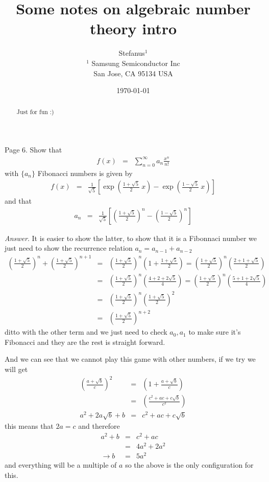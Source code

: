 \documentclass[aps,preprint,preprintnumbers,nofootinbib,showpacs,prd]{revtex4-1}
\newcommand{\nbea}{\begin{eqnarray*}}
\newcommand{\neea}{\end{eqnarray*}}
\begin{document}
\title{Some notes on algebraic number theory intro}
\bigskip
\author{Stefanus$^1$\\
$^1$ Samsung Semiconductor Inc\\ San Jose, CA 95134 USA\\
}
%
\date{\today}
%
\begin{abstract}
Just for fun :)

\end{abstract}
%
\maketitle

\renewcommand{\theequation}{A.\arabic{equation}}  %
\setcounter{equation}{0}  %


Page 6. Show that 
%
\nbea
f(x) & = & \sum_{n = 0}^{\infty} a_n \frac{x^n}{n!} 
\neea
%
with $\{a_n\}$ Fibonacci numbers is given by
%
\nbea
f(x) & = & \frac{1}{\sqrt{5}} \left \lbrack \exp \left ( \frac{1 + \sqrt{5}}{2}~x\right ) - \exp \left ( \frac{1 - \sqrt{5}}{2}~x\right ) \right \rbrack
\neea
%
and that 
%
\nbea
a_n & = & \frac{1}{\sqrt{5}} \left \lbrack \left ( \frac{1 + \sqrt{5}}{2}\right )^n - \left ( \frac{1 - \sqrt{5}}{2}\right )^n \right \rbrack
\neea
%

{\it Answer}. It is easier to show the latter, to show that it is a Fibonnaci number we just need to show the recurrence relation $a_n = a_{n-1} + a_{n - 2}$
%
\nbea
\left ( \frac{1 + \sqrt{5}}{2}\right )^{n} + \left ( \frac{1 + \sqrt{5}}{2}\right )^{n + 1} & = & \left ( \frac{1 + \sqrt{5}}{2}\right )^{n}\left ( 1 + \frac{1 + \sqrt{5}}{2}\right ) = \left ( \frac{1 + \sqrt{5}}{2}\right )^{n}\left ( \frac{2 + 1 + \sqrt{5}}{2}\right ) \\
& = & \left ( \frac{1 + \sqrt{5}}{2}\right )^{n}\left ( \frac{4 + 2 + 2\sqrt{5}}{4}\right ) = \left ( \frac{1 + \sqrt{5}}{2}\right )^{n}\left ( \frac{5 + 1 + 2\sqrt{5}}{4}\right ) \\
& = & \left ( \frac{1 + \sqrt{5}}{2}\right )^{n}\left ( \frac{1 + \sqrt{5}}{2}\right )^2 \\
& = & \left ( \frac{1 + \sqrt{5}}{2}\right )^{n + 2}
\neea
%
ditto with the other term and we just need to check $a_0, a_1$ to make sure it's Fibonacci and they are the rest is straight forward.

And we can see that we cannot play this game with other numbers, if we try we will get
%
\nbea
\left ( \frac{a + \sqrt{b}}{c} \right)^2 & = & \left (1 + \frac{a + \sqrt{b}}{c} \right ) \\
& = & \left ( \frac{c^2 + ac + c\sqrt{b}}{c^2} \right) \\
a^2 + 2a\sqrt{b} + b & = & c^2 + ac + c\sqrt{b}
\neea
%
this means that $2a = c$ and therefore
%
\nbea
a^2 + b & = & c^2 + ac \\
& = & 4a^2 + 2a^2 \\
\to b & = & 5a^2
\neea
%
and everything will be a multiple of $a$ so the above is the only configuration for this.
\end{document}
